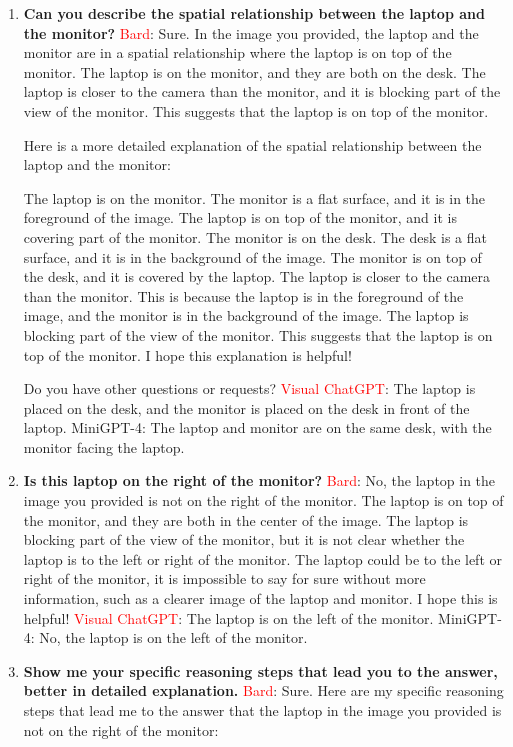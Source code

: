 \begin{enumerate}
    \item \textbf{Can you describe the spatial relationship between the laptop and the monitor?}
    \subitem \textcolor{Red}{Bard}: 
    Sure. In the image you provided, the laptop and the monitor are in a spatial relationship where the laptop is on top of the monitor. The laptop is on the monitor, and they are both on the desk. The laptop is closer to the camera than the monitor, and it is blocking part of the view of the monitor. This suggests that the laptop is on top of the monitor.

    Here is a more detailed explanation of the spatial relationship between the laptop and the monitor:

    The laptop is on the monitor. The monitor is a flat surface, and it is in the foreground of the image. The laptop is on top of the monitor, and it is covering part of the monitor.
    The monitor is on the desk. The desk is a flat surface, and it is in the background of the image. The monitor is on top of the desk, and it is covered by the laptop.
    The laptop is closer to the camera than the monitor. This is because the laptop is in the foreground of the image, and the monitor is in the background of the image.
    The laptop is blocking part of the view of the monitor. This suggests that the laptop is on top of the monitor.
    I hope this explanation is helpful!

    Do you have other questions or requests?
    \subitem \textcolor{red}{Visual ChatGPT}: The laptop is placed on the desk, and the monitor is placed on the desk in front of the laptop.
    \subitem MiniGPT-4: The laptop and monitor are on the same desk, with the monitor facing the laptop.
    \item \textbf{Is this laptop on the right of the monitor?}
    \subitem \textcolor{Red}{Bard}: 
    No, the laptop in the image you provided is not on the right of the monitor. The laptop is on top of the monitor, and they are both in the center of the image. The laptop is blocking part of the view of the monitor, but it is not clear whether the laptop is to the left or right of the monitor. The laptop could be to the left or right of the monitor, it is impossible to say for sure without more information, such as a clearer image of the laptop and monitor.
    I hope this is helpful!
    \subitem \textcolor{red}{Visual ChatGPT}: The laptop is on the left of the monitor.
    \subitem MiniGPT-4: No, the laptop is on the left of the monitor.
    \item \textbf{Show me your specific reasoning steps that lead you to the answer, better in detailed explanation.}
    \subitem \textcolor{Red}{Bard}: 
    Sure. Here are my specific reasoning steps that lead me to the answer that the laptop in the image you provided is not on the right of the monitor:
    

\end{enumerate}
